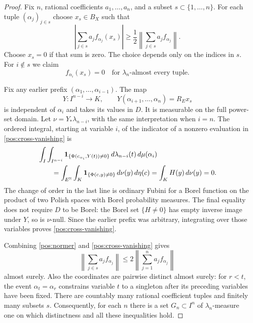 \begin{proof}
Fix $n$, rational coefficients $a_1,\ldots,a_n$, and a subset
$s\subset\{1,\ldots,n\}$.  For each tuple $(\alpha_j)_{j\in s}$ choose
$x_s\in B_X$ such that
\begin{equation}\label{pos:normer}
 \left|\sum_{j\in s}a_j f_{\alpha_j}(x_s)\right|
 \ge\frac12\left\|\sum_{j\in s}a_j f_{\alpha_j}\right\|.
\end{equation}
Choose $x_s=0$ if that sum is zero.  The choice depends only on the
indices in $s$.
For $i\notin s$ we claim
\begin{equation}\label{pos:cross-vanishing}
 f_{\alpha_i}(x_s)=0\quad\text{for $\lambda_n$-almost every tuple.}
\end{equation}

Fix any earlier prefix $(\alpha_1,\ldots,\alpha_{i-1})$.  The map
\[
 Y:I^{n-i}\longrightarrow K,\qquad
 Y(\alpha_{i+1},\ldots,\alpha_n)=R_Ex_s
\]
is independent of $\alpha_i$ and takes its values in $D$.  It is measurable
on the full power-set domain.  Let $\nu=Y_*\lambda_{n-i}$, with the same
interpretation when $i=n$.  The ordered integral, starting at variable
$i$, of the indicator of a nonzero evaluation in
\eqref{pos:cross-vanishing} is
\begin{align*}
 &\int_I\int_{I^{n-i}}
    \mathbf1_{\{\Phi(c_{\alpha_i},Y(t))\ne0\}}
           \,d\lambda_{n-i}(t)\,d\mu(\alpha_i)\\
 &\qquad=\int_{E^{\mathbb N}}\int_K
    \mathbf1_{\{\Phi(c,y)\ne0\}}\,d\nu(y)\,d\eta(c)
   =\int_K H(y)\,d\nu(y)=0.
\end{align*}
The change of order in the last line is ordinary Fubini for a Borel
function on the product of two Polish spaces with Borel probability
measures.  The final equality does not require $D$ to be Borel:
the Borel set $\{H\ne0\}$ has empty inverse image under $Y$, so is
$\nu$-null.  Since the earlier prefix was arbitrary, integrating over
those variables proves \eqref{pos:cross-vanishing}.

Combining \eqref{pos:normer} and \eqref{pos:cross-vanishing} gives
\begin{equation}\label{pos:suppression}
 \left\|\sum_{j\in s}a_j f_{\alpha_j}\right\|
 \le2\left\|\sum_{j=1}^n a_j f_{\alpha_j}\right\|
\end{equation}
almost surely.  Also the coordinates are pairwise distinct almost surely:
for $r<t$, the event $\alpha_t=\alpha_r$ constrains variable $t$ to a
singleton after its preceding variables have been fixed.  There are
countably many rational coefficient tuples and finitely many subsets $s$.
Consequently, for each $n$ there is a set $G_n\subset I^n$ of
$\lambda_n$-measure one on which distinctness and all these inequalities
hold.


\end{proof}
